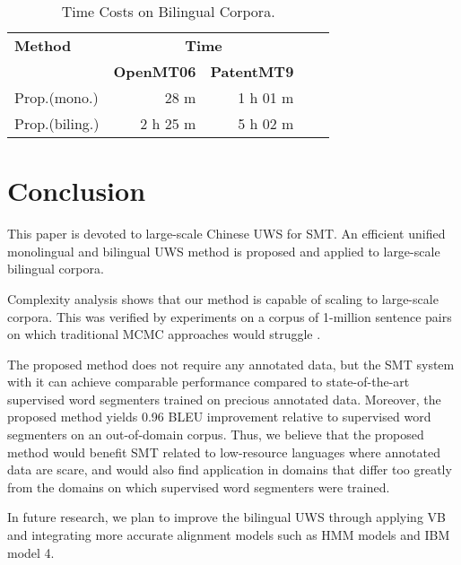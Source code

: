 \documentclass[11pt]{article}
\begin{document}
\begin{table}{\small
\begin{center}
\begin{tabular}{|l|rr|rr|}
\hline
\bf Method&\multicolumn{2}{|c|}{\bf Time} \\
 &\bf OpenMT06 & \bf PatentMT9  \\
 \hline 
Prop.(mono.)                      &      28 m & 1 h 01 m \\    
Prop.(biling.)        &  2 h 25 m & 5 h 02 m \\  
\hline
\end{tabular}
\end{center}
\caption{\label{tab:biling:time} Time Costs on Bilingual Corpora.}
}\end{table}

\section{Conclusion}
This paper is devoted to large-scale Chinese UWS for SMT.  An efficient
unified monolingual and bilingual UWS method is proposed and applied to
large-scale bilingual corpora.

Complexity analysis shows that
our method is capable of scaling to large-scale corpora. 
This was verified by experiments on a corpus of 1-million sentence pairs on
which traditional MCMC approaches would struggle \cite{xu2008bayesian}.

The proposed method does not require any annotated data, but the SMT system
with it can achieve comparable performance compared to
state-of-the-art supervised word segmenters trained on precious annotated
data.  Moreover, the proposed method yields 0.96 BLEU improvement relative to
supervised word segmenters on an out-of-domain corpus.  Thus, we believe that the
proposed method would benefit SMT related to low-resource languages where annotated
data are scare, and would also find application in domains that differ too greatly
from the domains on which supervised word segmenters were trained.

In future research, we plan to improve the bilingual UWS through applying VB and integrating more accurate alignment models such as HMM models and IBM model 4. 




\end{document}
